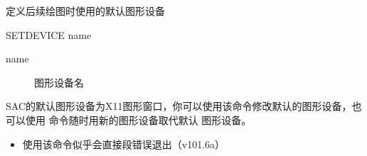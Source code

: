 \label{cmd:setdevice}

定义后续绘图时使用的默认图形设备

\begin{SACSTX}
SETDEVICE name
\end{SACSTX}

\begin{description}
\item [name] 图形设备名
\end{description}

SAC的默认图形设备为X11图形窗口，你可以使用该命令修改默认的图形设备，也
可以使用  命令随时用新的图形设备取代默认
图形设备。

\begin{itemize}
\item 使用该命令似乎会直接段错误退出（v101.6a）
\end{itemize}
